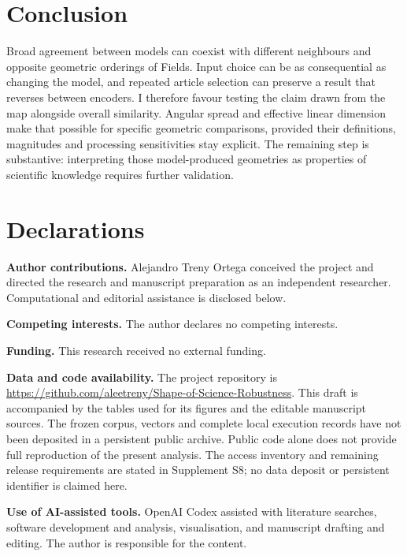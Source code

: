 \documentclass[12pt]{article}
\begin{document}
\section{Conclusion}
Broad agreement between models can coexist with different neighbours and opposite geometric orderings of Fields. Input choice can be as consequential as changing the model, and repeated article selection can preserve a result that reverses between encoders. I therefore favour testing the claim drawn from the map alongside overall similarity. Angular spread and effective linear dimension make that possible for specific geometric comparisons, provided their definitions, magnitudes and processing sensitivities stay explicit. The remaining step is substantive: interpreting those model-produced geometries as properties of scientific knowledge requires further validation.

\section*{Declarations}
\textbf{Author contributions.}
Alejandro Treny Ortega conceived the project and directed the research and manuscript preparation as an independent researcher. Computational and editorial assistance is disclosed below.
\par\medskip
\textbf{Competing interests.}
The author declares no competing interests.
\par\medskip
\textbf{Funding.}
This research received no external funding.
\par\medskip
\textbf{Data and code availability.}
The project repository is \url{https://github.com/aleetreny/Shape-of-Science-Robustness}. This draft is accompanied by the tables used for its figures and the editable manuscript sources. The frozen corpus, vectors and complete local execution records have not been deposited in a persistent public archive. Public code alone does not provide full reproduction of the present analysis. The access inventory and remaining release requirements are stated in Supplement S8; no data deposit or persistent identifier is claimed here.
\par\medskip
\textbf{Use of AI-assisted tools.}
OpenAI Codex assisted with literature searches, software development and analysis, visualisation, and manuscript drafting and editing. The author is responsible for the content.



\end{document}
